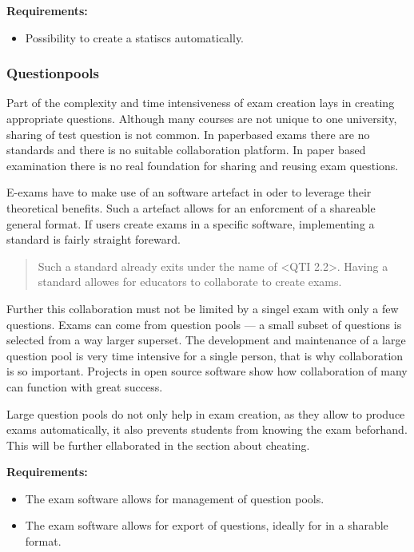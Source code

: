 \textbf{Requirements:}

\begin{itemize}
\tightlist
\item
  Possibility to create a statiscs automatically.
\end{itemize}

\hypertarget{questionpools}{%
\subsubsection{Questionpools}\label{questionpools}}

Part of the complexity and time intensiveness of exam creation lays in
creating appropriate questions. Although many courses are not unique to
one university, sharing of test question is not common. In paperbased
exams there are no standards and there is no suitable collaboration
platform. In paper based examination there is no real foundation for
sharing and reusing exam questions.

E-exams have to make use of an software artefact in oder to leverage
their theoretical benefits. Such a artefact allows for an enforcment of
a shareable general format. If users create exams in a specific
software, implementing a standard is fairly straight foreward.

\begin{quote}
Such a standard already exits under the name of \textless{}QTI
2.2\textgreater{}. Having a standard allowes for educators to
collaborate to create exams.
\end{quote}

Further this collaboration must not be limited by a singel exam with
only a few questions. Exams can come from question pools --- a small
subset of questions is selected from a way larger superset. The
development and maintenance of a large question pool is very time
intensive for a single person, that is why collaboration is so
important. Projects in open source software show how collaboration of
many can function with great success.

Large question pools do not only help in exam creation, as they allow to
produce exams automatically, it also prevents students from knowing the
exam beforhand. This will be further ellaborated in the section about
cheating.

\textbf{Requirements:}

\begin{itemize}
\tightlist
\item
  The exam software allows for management of question pools.
\item
  The exam software allows for export of questions, ideally for in a
  sharable format.
\end{itemize}

